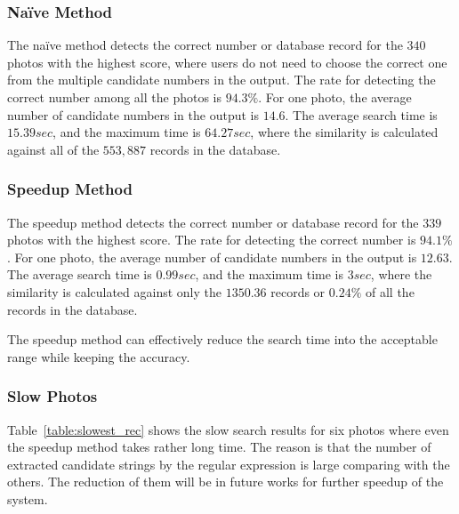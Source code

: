\documentclass[technicalreport]{ieicej}
\begin{document}
        \subsubsection{Naïve Method}
            The naïve method detects the correct number or database record for the $340$ photos with the highest score, where users do not need to choose the correct one from the multiple candidate numbers in the output. The rate for detecting the correct number among all the photos is $94.3\%$. For one photo, the average number of candidate numbers in the output is $14.6$. The average search time is $15.39sec$, and the maximum time is $64.27sec$, where the similarity is calculated against all of the $553,887$ records in the database.
        
        \subsubsection{Speedup Method}
            The speedup method detects the correct number or database record for the $339$ photos with the highest score. The rate for detecting the correct number is $94.1\%$. For one photo, the average number of candidate numbers in the output is $12.63$. The average search time is $0.99sec$, and the maximum time is $3sec$, where the similarity is calculated against only the $1350.36$ records or $0.24\%$ of all the records in the database.
            
            The speedup method can effectively reduce the search time into the acceptable range while keeping the accuracy. 

        \subsubsection{Slow Photos}
            Table~\ref{table:slowest_rec} shows the slow search results for six photos where even the speedup method takes rather long time. The reason is that the number of extracted candidate strings by the regular expression is large comparing with the others. The reduction of them will be in future works for further speedup of the system.
        
\end{document}
